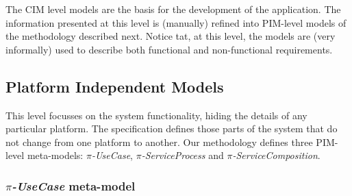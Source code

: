 The CIM level models are the basis for the development of the application. 
The information presented at this level is (manually) refined into PIM-level models of the methodology \pisodm described next.
Notice tat, at this level, the models are (very informally) used to describe both functional and non-functional requirements.

\subsection{Platform Independent Models}

This level focusses on the system functionality, hiding the details of any particular platform.
The specification defines those parts of the system that do not change from one platform to another. 
Our methodology defines three PIM-level meta-models: \textit{$\pi$-UseCase}, \textit{$\pi$-ServiceProcess} and \textit{$\pi$-ServiceComposition}.
 
\subsubsection{\textit{$\pi$-UseCase} meta-model}%

